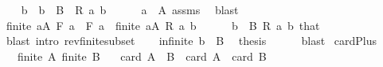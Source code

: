 \begin{isabellebody}
\isanewline
\ \ \isamarkupfalse%
\ b{}\ \ {\isachardoublequoteopen}b{}\ {\isasymin}\ B{\isachardoublequoteclose}\ \ {\isachardoublequoteopen}R\ a{}\ b{}{\isachardoublequoteclose}\isanewline
\ \ \ \ \isamarkupfalse%
\ {\isacartoucheopen}a{}\ {\isasymin}\ A{\isacartoucheclose}\ assms{\isacharparenleft}{\kern0pt}{}{\isacharparenright}{\kern0pt}\ \isamarkupfalse%
\ blast\isanewline
\ \ \isamarkupfalse%
\ {\isachardoublequoteopen}finite\ {\isacharbraceleft}{\kern0pt}a{\isasymin}A{\isachardot}{\kern0pt}\ {\isacharquery}{\kern0pt}F\ a\ {\isacharequal}{\kern0pt}\ {\isacharquery}{\kern0pt}F\ a{}{\isacharbraceright}{\kern0pt}{\isachardoublequoteclose}\ \ {\isachardoublequoteopen}finite\ {\isacharbraceleft}{\kern0pt}a{\isasymin}A{\isachardot}{\kern0pt}\ R\ a\ b{}{\isacharbraceright}{\kern0pt}{\isachardoublequoteclose}\isanewline
\ \ \ \ \isamarkupfalse%
\ {\isacartoucheopen}b{}\ {\isasymin}\ B{\isacartoucheclose}\ {\isacartoucheopen}R\ a{}\ b{}{\isacartoucheclose}\ that\ \isamarkupfalse%
\ {\isacharparenleft}{\kern0pt}blast\ intro{\isacharcolon}{\kern0pt}\ rev{\isacharunderscore}{\kern0pt}finite{\isacharunderscore}{\kern0pt}subset{\isacharparenright}{\kern0pt}\isanewline
\ \ \isamarkupfalse%
\ infinite\ {\isacartoucheopen}b{}\ {\isasymin}\ B{\isacartoucheclose}\ \isamarkupfalse%
\ {\isacharquery}{\kern0pt}thesis\isanewline
\ \ \ \ \isamarkupfalse%
\ blast\isanewline
{}\isamarkupfalse%
%
\endisatagproof
{\isafoldproof}%
%
\isadelimproof
%
\endisadelimproof
%
\isadelimdocument
%
\endisadelimdocument
%
\isatagdocument
%
\isamarkuptrue%
%
\endisatagdocument
{\isafolddocument}%
%
\isadelimdocument
%
\endisadelimdocument
{}\isamarkupfalse%
\ card{\isacharunderscore}{\kern0pt}Plus{\isacharcolon}{\kern0pt}\isanewline
\ \ \ {\isachardoublequoteopen}finite\ A{\isachardoublequoteclose}\ {\isachardoublequoteopen}finite\ B{\isachardoublequoteclose}\isanewline
\ \ \ {\isachardoublequoteopen}card\ {\isacharparenleft}{\kern0pt}A\ {\isacharless}{\kern0pt}{\isacharplus}{\kern0pt}{\isachargreater}{\kern0pt}\ B{\isacharparenright}{\kern0pt}\ {\isacharequal}{\kern0pt}\ card\ A\ {\isacharplus}{\kern0pt}\ card\ B{\isachardoublequoteclose}\isanewline

\end{isabellebody}
